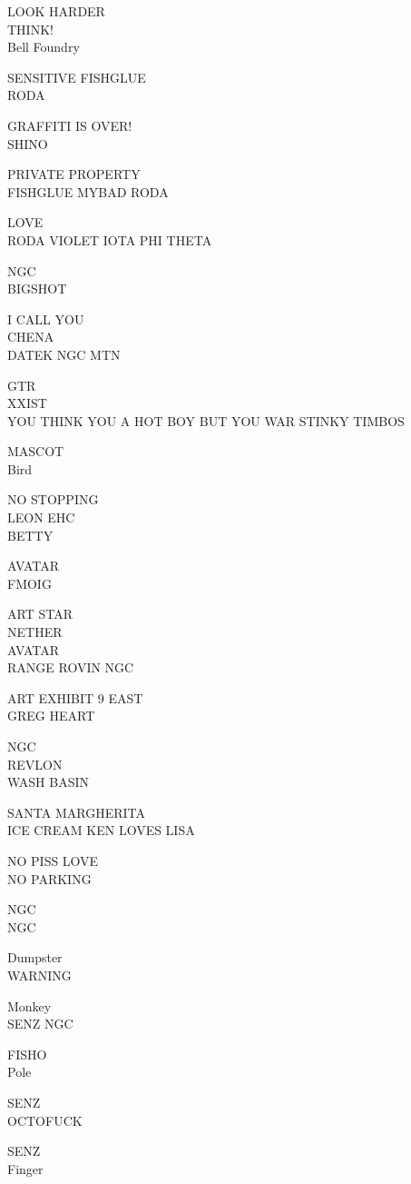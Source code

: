\documentclass[10pt,letterpaper]{article}
\begin{document}
LOOK HARDER\\
THINK!\\
Bell Foundry

SENSITIVE FISHGLUE\\
RODA

GRAFFITI IS OVER!\\
SHINO

PRIVATE PROPERTY\\
FISHGLUE MYBAD RODA

LOVE\\
RODA VIOLET IOTA PHI THETA

NGC\\
BIGSHOT

I CALL YOU\\
CHENA\\
DATEK NGC MTN

GTR\\
XXIST\\
YOU THINK YOU A HOT BOY BUT YOU WAR STINKY TIMBOS

MASCOT\\
Bird

NO STOPPING\\
LEON EHC\\
BETTY

AVATAR\\
FMOIG

ART STAR\\
NETHER\\
AVATAR\\
RANGE ROVIN NGC

ART EXHIBIT 9 EAST\\
GREG HEART

NGC\\
REVLON\\
WASH BASIN

SANTA MARGHERITA\\
ICE CREAM KEN LOVES LISA

NO PISS LOVE\\
NO PARKING

NGC\\
NGC

Dumpster\\
WARNING

Monkey\\
SENZ NGC

FISHO\\
Pole

SENZ\\
OCTOFUCK

SENZ\\
Finger
\end{document}
